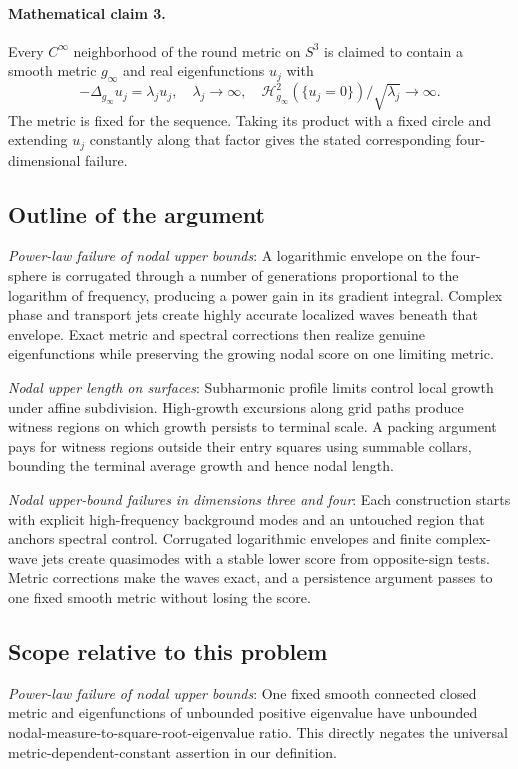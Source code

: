 \documentclass[11pt]{article}
\begin{document}
\paragraph{Mathematical claim 3.} Every $C^\infty$ neighborhood of the round metric on $S^3$ is claimed to contain a smooth metric $g_\infty$ and real eigenfunctions $u_j$ with \[-\Delta_{g_\infty}u_j=\lambda_ju_j,\quad\lambda_j\to\infty,\quad\mathcal H_{g_\infty}^2(\{u_j=0\})/\sqrt{\lambda_j}\to\infty.\] The metric is fixed for the sequence. Taking its product with a fixed circle and extending $u_j$ constantly along that factor gives the stated corresponding four-dimensional failure.

\subsection{Outline of the argument}
\textit{Power-law failure of nodal upper bounds}: A logarithmic envelope on the four-sphere is corrugated through a number of generations proportional to the logarithm of frequency, producing a power gain in its gradient integral. Complex phase and transport jets create highly accurate localized waves beneath that envelope. Exact metric and spectral corrections then realize genuine eigenfunctions while preserving the growing nodal score on one limiting metric.

\textit{Nodal upper length on surfaces}: Subharmonic profile limits control local growth under affine subdivision. High-growth excursions along grid paths produce witness regions on which growth persists to terminal scale. A packing argument pays for witness regions outside their entry squares using summable collars, bounding the terminal average growth and hence nodal length.

\textit{Nodal upper-bound failures in dimensions three and four}: Each construction starts with explicit high-frequency background modes and an untouched region that anchors spectral control. Corrugated logarithmic envelopes and finite complex-wave jets create quasimodes with a stable lower score from opposite-sign tests. Metric corrections make the waves exact, and a persistence argument passes to one fixed smooth metric without losing the score.

\subsection{Scope relative to this problem}
\textit{Power-law failure of nodal upper bounds}: One fixed smooth connected closed metric and eigenfunctions of unbounded positive eigenvalue have unbounded nodal-measure-to-square-root-eigenvalue ratio. This directly negates the universal metric-dependent-constant assertion in our definition.
\end{document}

